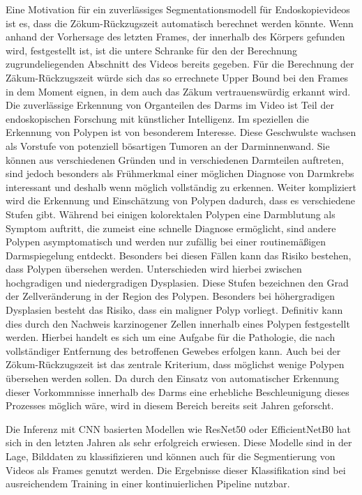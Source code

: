 Eine Motivation für ein zuverlässiges Segmentationsmodell für Endoskopievideos ist es, 
dass die Zökum-Rückzugszeit automatisch berechnet werden könnte. Wenn anhand der Vorhersage des letzten Frames, 
der innerhalb des Körpers gefunden wird, festgestellt ist, ist die untere Schranke für den der Berechnung zugrundeliegenden Abschnitt des 
Videos bereits gegeben. Für die Berechnung der Zäkum-Rückzugszeit würde sich das so errechnete Upper Bound bei den Frames in dem Moment eignen, 
in dem auch das Zäkum vertrauenswürdig erkannt wird. Die zuverlässige Erkennung von Organteilen des Darms im Video ist 
Teil der endoskopischen Forschung mit künstlicher Intelligenz. Im speziellen die Erkennung von Polypen ist von besonderem Interesse. 
Diese Geschwulste wachsen als Vorstufe von potenziell bösartigen Tumoren an der Darminnenwand. Sie können aus verschiedenen Gründen und in verschiedenen Darmteilen auftreten, 
sind jedoch besonders als Frühmerkmal einer möglichen Diagnose von Darmkrebs interessant und deshalb wenn möglich vollständig zu erkennen. \citep{doi:10.7326/0003-4819-157-4-201208210-00002}
Weiter kompliziert wird die Erkennung und Einschätzung von Polypen dadurch, dass es verschiedene Stufen gibt.
Während bei einigen kolorektalen Polypen eine Darmblutung als Symptom auftritt, die zumeist eine schnelle Diagnose ermöglicht, sind andere Polypen asymptomatisch und werden nur zufällig bei einer routinemäßigen Darmspiegelung entdeckt.
Besonders bei diesen Fällen kann das Risiko bestehen, dass Polypen übersehen werden.
Unterschieden wird hierbei zwischen hochgradigen und niedergradigen Dysplasien. Diese Stufen bezeichnen den Grad der Zellveränderung in der Region des Polypen.
Besonders bei höhergradigen Dysplasien besteht das Risiko, dass ein maligner Polyp vorliegt.
Definitiv kann dies durch den Nachweis karzinogener Zellen innerhalb eines Polypen festgestellt werden. Hierbei handelt es sich um eine Aufgabe für die Pathologie,
die nach vollständiger Entfernung des betroffenen Gewebes erfolgen kann. \citep{Colucci261}
Auch bei der Zökum-Rückzugszeit ist das zentrale Kriterium, dass möglichst wenige Polypen übersehen werden sollen. 
Da durch den Einsatz von automatischer Erkennung dieser Vorkommnisse innerhalb des Darms eine erhebliche Beschleunigung dieses 
Prozesses möglich wäre, wird in diesem Bereich bereits seit Jahren geforscht. \citep{talukder-2022} 

Die Inferenz mit CNN basierten Modellen wie ResNet50 oder EfficientNetB0 hat sich in den letzten Jahren als sehr erfolgreich erwiesen.
Diese Modelle sind in der Lage, Bilddaten zu klassifizieren und können auch für die Segmentierung von Videos als Frames genutzt werden.
Die Ergebnisse dieser Klassifikation sind bei ausreichendem Training in einer kontinuierlichen Pipeline nutzbar.

